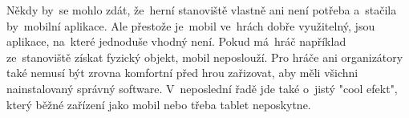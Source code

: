 Někdy by~se mohlo zdát, že~herní stanoviště vlastně ani není potřeba a~stačila by~mobilní aplikace.
Ale přestože je~mobil ve~hrách dobře využitelný, jsou aplikace, na~které jednoduše vhodný není.
Pokud má~hráč například ze~stanoviště získat fyzický objekt, mobil neposlouží.
Pro hráče ani organizátory také nemusí být zrovna komfortní před hrou zařizovat, aby měli všichni nainstalovaný správný software.
V~neposlední řadě jde také o~jistý "cool efekt", který běžné zařízení jako mobil nebo třeba tablet neposkytne. %


